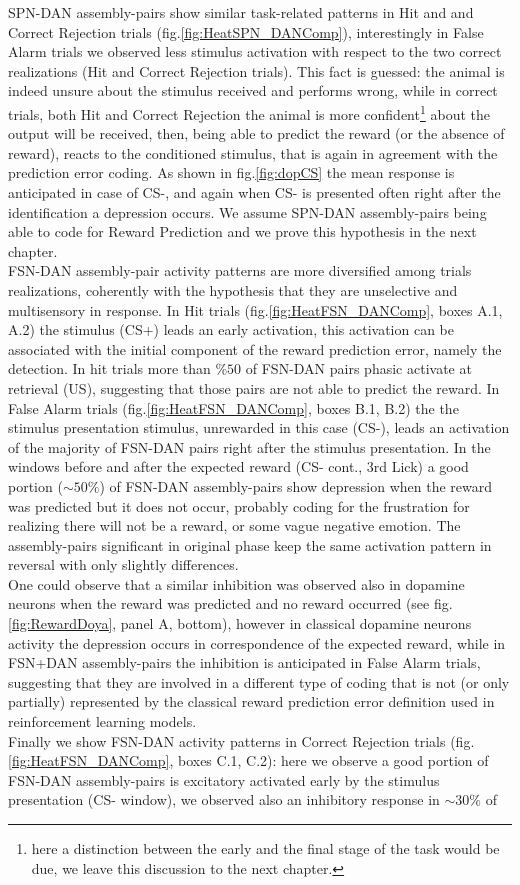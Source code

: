 SPN-DAN assembly-pairs show similar task-related patterns in Hit and and Correct Rejection trials (fig.\ref{fig:HeatSPN_DANComp}), interestingly in False Alarm trials we observed less stimulus activation with respect to the two correct realizations (Hit and Correct Rejection trials). This fact is guessed: the animal is indeed unsure about the stimulus received and performs wrong, while in correct trials, both Hit and Correct Rejection the animal is more confident\footnote{here a distinction between the early and the final stage of the task would be due, we leave this discussion to the next chapter.} about the output will be received, then, being able to predict the reward (or the absence of reward), reacts to the conditioned stimulus, that is again in agreement with the prediction error coding. As shown in fig.\ref{fig:dopCS} the mean response is anticipated in case of CS-, and again when CS- is presented often right after the identification a depression occurs. We assume SPN-DAN assembly-pairs being able to code for Reward Prediction and we prove this hypothesis in the next chapter.\\FSN-DAN assembly-pair activity patterns are more diversified among trials realizations, coherently with the hypothesis that they are unselective and multisensory in response. In Hit trials (fig.\ref{fig:HeatFSN_DANComp}, boxes A.1, A.2) the stimulus (CS+) leads an early activation, this activation can be associated with the initial component of the reward prediction error, namely the detection. In hit trials more than $\% 50$ of FSN-DAN pairs phasic activate at retrieval (US), suggesting that those pairs are not able to predict the reward. In False Alarm trials (fig.\ref{fig:HeatFSN_DANComp}, boxes B.1, B.2) the the stimulus presentation stimulus, unrewarded in this case (CS-), leads an activation of the majority of FSN-DAN pairs right after the stimulus presentation. In the windows before and after the expected reward (CS- cont., 3rd Lick) a good portion ($\sim50\%$) of FSN-DAN assembly-pairs show depression when the reward was predicted but it does not occur, probably coding for the frustration for realizing there will not be a reward, or some vague negative emotion. The assembly-pairs significant in original phase keep the same activation pattern in reversal with only slightly differences.\\One could observe that a similar inhibition was observed also in dopamine neurons when the reward was predicted and no reward occurred (see fig.\ref{fig:RewardDoya}, panel A, bottom), however in classical dopamine neurons activity the depression occurs in correspondence of the expected reward, while in FSN+DAN assembly-pairs the inhibition is anticipated in False Alarm trials, suggesting that they are involved in a different type of coding that is not (or only partially) represented by the classical reward prediction error definition used in reinforcement learning models.\\Finally we show FSN-DAN activity patterns in Correct Rejection trials (fig.\ref{fig:HeatFSN_DANComp}, boxes C.1, C.2): here we observe a good portion of FSN-DAN assembly-pairs is excitatory activated early by the stimulus presentation (CS- window), we observed also an inhibitory response in $\sim30\%$ of 